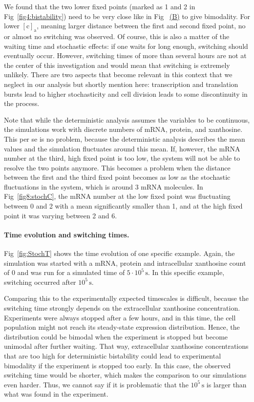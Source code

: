 \documentclass[10pt,letterpaper]{article}
\newcommand{\unit}[1]{\,\mathrm{#1}}
\newcommand{\n}[1]{\mathrm{#1}}
\newcommand\subref[2]{%
	\def\myref{\getrefnumber{#1}}%
	\hyperref[#1]{\myref\mbox{#2}}%
}
\begin{document}
We found that the two lower fixed points (marked as 1 and 2 in
Fig~\ref{fig4:bistability}) need to be very close like in
Fig~\subref{fig8:stochC}{(B)} to give bimodality. For lower $\n{[c]_a}$,
meaning larger distance between the first and second fixed point, no or
almost no switching was observed. Of course, this is also a matter of the
waiting time and stochastic effects: if one waits for long enough, switching
should eventually occur. However, switching times of more than several hours
are not at the center of this investigation and would mean that switching is
extremely unlikely. There are two aspects that become relevant in this
context that we neglect in our analysis but shortly mention here:
transcription and translation bursts lead to higher stochasticity and cell
division leads to some discontinuity in the process.

Note that while the deterministic analysis assumes the variables to be
continuous, the simulations work with discrete numbers of mRNA, protein, and
xanthosine. This per se is no problem, because the deterministic analysis
describes the mean values and the simulation fluctuates around this mean.
If, however, the mRNA number at the third, high fixed point is too low, the
system will not be able to resolve the two points anymore. This becomes a
problem when the distance between the first and the third fixed point
becomes as low as the stochastic fluctuations in the system, which is around
3 mRNA molecules. In Fig~\ref{fig8:stochC}, the mRNA number at the low fixed
point was fluctuating between 0 and 2 with a mean significantly smaller than
1, and at the high fixed point it was varying between 2 and 6.

\paragraph*{Time evolution and switching times.}
Fig~\ref{fig:StochT} shows the time evolution of one specific example.
Again, the simulation was started with a mRNA, protein and intracellular
xanthosine count of 0 and was run for a simulated time of $5 \cdot 10^5
\unit{s}$. In this specific example, switching occurred after $10^5
\unit{s}$. 

Comparing this to the experimentally expected timescales is difficult,
because the switching time strongly depends on the extracellular xanthosine
concentration. Experiments were always stopped after a few hours, and in
this time, the cell population might not reach its steady-state expression
distribution. Hence, the distribution could be bimodal when the experiment
is stopped but become unimodal after further waiting. That way,
extracellular xanthosine concentrations that are too high for deterministic
bistability could lead to experimental bimodality if the experiment is
stopped too early. In this case, the observed switching time would be
shorter, which makes the comparison to our simulations even harder. Thus, we
cannot say if it is problematic that the $10^5 \unit{s}$ is larger than what
was found in the experiment.
\end{document}
